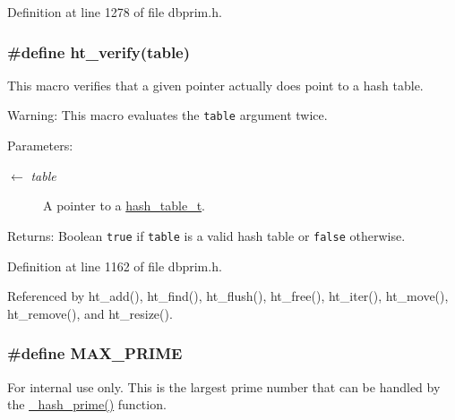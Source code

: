 Definition at line 1278 of file dbprim.h.\hypertarget{group__dbprim__hash_ga27}{
\subsubsection[ht\_\-verify]{\setlength{\rightskip}{0pt plus 5cm}\#define ht\_\-verify(table)}}
\label{group__dbprim__hash_ga27}


This macro verifies that a given pointer actually does point to a hash table.

\begin{Desc}
\item[Warning:]This macro evaluates the {\tt table} argument twice.\end{Desc}
\begin{Desc}
\item[Parameters:]
\begin{description}
\item[\mbox{$\leftarrow$} {\em table}]A pointer to a \hyperlink{group__dbprim__hash_ga1}{hash\_\-table\_\-t}.\end{description}
\end{Desc}
\begin{Desc}
\item[Returns:]Boolean {\tt true} if {\tt table} is a valid hash table or {\tt false} otherwise.\end{Desc}


Definition at line 1162 of file dbprim.h.

Referenced by ht\_\-add(), ht\_\-find(), ht\_\-flush(), ht\_\-free(), ht\_\-iter(), ht\_\-move(), ht\_\-remove(), and ht\_\-resize().\hypertarget{group__dbprim__hash_ga21}{
\subsubsection[MAX\_\-PRIME]{\setlength{\rightskip}{0pt plus 5cm}\#define MAX\_\-PRIME}}
\label{group__dbprim__hash_ga21}


\begin{Desc}
\item[For internal use only.]
This is the largest prime number that can be handled by the \hyperlink{group__dbprim__hash_ga20}{\_\-hash\_\-prime()} function.\end{Desc}


